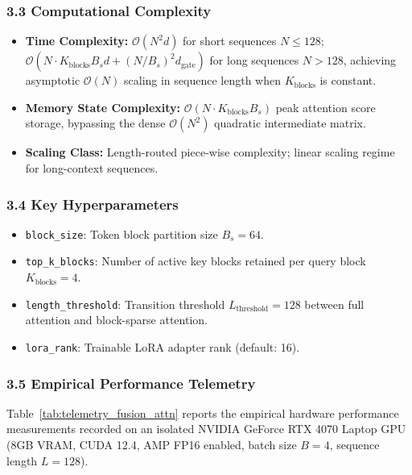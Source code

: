 \subsubsection*{3.3 Computational Complexity}
\begin{itemize}
    \item \textbf{Time Complexity:} $\mathcal{O}(N^2 d)$ for short sequences $N \le 128$; $\mathcal{O}\left(N \cdot K_{\text{blocks}} B_s d + (N / B_s)^2 d_{\text{gate}}\right)$ for long sequences $N > 128$, achieving asymptotic $\mathcal{O}(N)$ scaling in sequence length when $K_{\text{blocks}}$ is constant.
    \item \textbf{Memory State Complexity:} $\mathcal{O}(N \cdot K_{\text{blocks}} B_s)$ peak attention score storage, bypassing the dense $\mathcal{O}(N^2)$ quadratic intermediate matrix.
    \item \textbf{Scaling Class:} Length-routed piece-wise complexity; linear scaling regime for long-context sequences.
\end{itemize}

\subsubsection*{3.4 Key Hyperparameters}
\begin{itemize}
    \item \texttt{block\_size}: Token block partition size $B_s = 64$.
    \item \texttt{top\_k\_blocks}: Number of active key blocks retained per query block $K_{\text{blocks}} = 4$.
    \item \texttt{length\_threshold}: Transition threshold $L_{\text{threshold}} = 128$ between full attention and block-sparse attention.
    \item \texttt{lora\_rank}: Trainable LoRA adapter rank (default: 16).
\end{itemize}

\subsubsection*{3.5 Empirical Performance Telemetry}
Table~\ref{tab:telemetry_fusion_attn} reports the empirical hardware performance measurements recorded on an isolated NVIDIA GeForce RTX 4070 Laptop GPU (8GB VRAM, CUDA 12.4, AMP FP16 enabled, batch size $B=4$, sequence length $L=128$).

